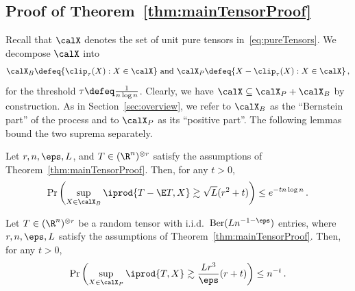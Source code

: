 \documentclass[11pt,a4paper]{article}
\begin{document}
\subsection{Proof of \texorpdfstring{Theorem~\ref{thm:mainTensorProof}}{main theorem}}
\label{sec:proofFirst}

Recall that $\calX$ denotes the set of
unit pure tensors in~\eqref{eq:pureTensors}.
We decompose $\calX$ into
\begin{equation}
    \calX_B \defeq \{\clip_\tau(X) : X\in \calX\} \text{ and }\calX_P \defeq \{X - \clip_\tau(X) : X\in \calX\}\,,\label{eq:decomposition}
\end{equation}
for the threshold $\tau\defeq\frac 1 {n\log n}$.
Clearly, we have $\calX\subseteq \calX_P + \calX_B$ by construction. As in Section~\ref{sec:overview}, we refer to $\calX_B$
as the ``Bernstein part'' of the process and to $\calX_P$
as its ``positive part''.
The following lemmas bound the two suprema separately.

\begin{lemma}\label{lem:bernsteinPart}
    Let $r,n,\eps,L$, and $T\in (\R^n)^{\otimes r}$
    satisfy the assumptions of Theorem~\ref{thm:mainTensorProof}. Then,
    for any $t>0$,
    \[
        \Pr\left(\sup_{X\in \calX_B} \iprod{T - \E T, X} \gtrsim \sqrt L(r^2 + t)\right)\le e^{-tn\log n}\,.
    \]
\end{lemma}

\begin{lemma}\label{lem:positivePart}
    Let $T\in (\R^n)^{\otimes r}$ be a random tensor with i.i.d.\ $\textnormal{Ber}(Ln^{-1-\eps})$ entries, where $r,n,\eps,L$
    satisfy the assumptions of Theorem~\ref{thm:mainTensorProof}. Then,
    for any $t>0$,
    \[
        \Pr\left(\sup_{X\in \calX_P} \iprod{T, X}\gtrsim \frac {Lr^3} \eps (r + t)\right)\le n^{-t}\,.
    \]
\end{lemma}
\end{document}
